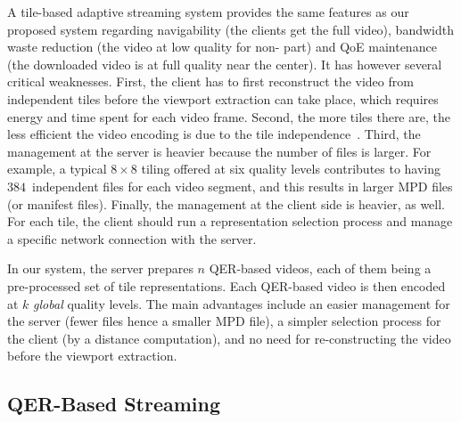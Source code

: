 A tile-based adaptive streaming system provides the same features as
our proposed system regarding navigability (the clients get the full
video), bandwidth waste reduction (the video at low quality for
non-\FoV{} part) and \ac{QoE} maintenance (the downloaded video is
at full quality near the \FoV{} center). It has however several
critical weaknesses. First, the client has to first reconstruct the
video from independent tiles before the viewport extraction can take
place, which requires energy and time spent for each video frame.
Second, the more tiles there are, the less efficient the video
encoding is due to the tile
independence~\cite{sanchez_compressed_2015}. Third, the management at
the server is heavier because the number of files is larger. For
example, a typical $8\times8$ tiling offered at six quality levels
contributes to having $384$~independent files for each video segment,
and this results in larger \ac{MPD} files (or manifest
files). Finally, the management at the client side is heavier, as
well. For each tile, the client should run a representation selection
process and manage a specific network connection with the server.

In our system, the server
prepares $n$ \ac{QER}-based videos, each of them being a
pre-processed set of tile representations. Each \ac{QER}-based video is then
encoded at $k$ \emph{global} quality levels.
The main advantages include
an easier management for the server (fewer files hence a smaller
\ac{MPD} file), a simpler selection process for the client (by a
distance computation), and no need for re-constructing the video before
the viewport extraction.

\subsection{\acs{QER}-Based Streaming}

